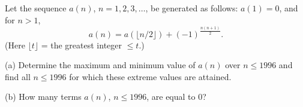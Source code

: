 Let the sequence $a(n)$, $n = 1, 2, 3, \ldots$, be generated as follows: $a(1) = 0$, and for $n > 1$,
\[ a(n) = a(\lfloor n/2 \rfloor) + (-1)^{\frac{n(n+1)}{2}}. \]
(Here $\lfloor t \rfloor$ = the greatest integer $\leq t$.)

(a) Determine the maximum and minimum value of $a(n)$ over $n \leq 1996$ and find all $n \leq 1996$ for which these extreme values are attained.

(b) How many terms $a(n)$, $n \leq 1996$, are equal to $0$?
